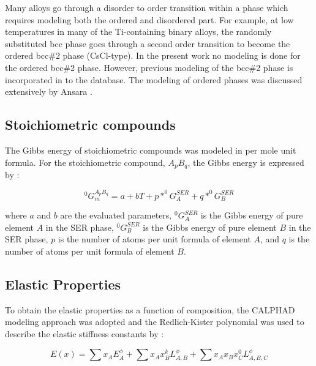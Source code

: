 Many alloys go through a disorder to order transition within a phase which requires modeling both the ordered and disordered part. For example, at low temperatures in many of the Ti-containing binary alloys, the randomly substituted bcc phase goes through a second order transition to become the ordered bcc\#2 phase (CsCl-type). In the present work no modeling is done for the ordered bcc\#2 phase. However, previous modeling of the bcc\#2 phase is incorporated in to the database. The modeling of ordered phases was discussed extensively by Ansara \cite{Ansara1998}. 

\subsection{Stoichiometric compounds}

The Gibbs energy of stoichiometric compounds was modeled in per mole unit formula. For the stoichiometric compound, $A_{p}B_{q}$, the Gibbs energy is expressed by \cite{Zacherl2012}: 

\begin{equation}
\label{eq: stoichiometric}
^{0}G_{m}^{A_{p}B_{q}} = a + bT + p * ^{0}G_{A}^{SER} + q * ^{0}G_{B}^{SER}
\end{equation}

\noindent where $a$ and $b$ are the evaluated parameters, $^{0}G_{A}^{SER}$ is the Gibbs energy of pure element $A$ in the SER phase, $^{0}G_{B}^{SER}$ is the Gibbs energy of pure element $B$ in the SER phase, $p$ is the number of atoms per unit formula of element $A$, and $q$ is the number of atoms per unit formula of element $B$.

\subsection{Elastic Properties}

To obtain the elastic properties as a function of composition, the CALPHAD modeling approach was adopted and the Redlich-Kister polynomial was used to describe the elastic stiffness constants by \cite{Redlich1948b,Shang2010c}: 

\begin{equation}
\label{eq: elastic}
E(x) = \sum x_{A} E_{A}^{\phi} + \sum x_{A} x_{B} ^{k}L_{A,B}^{\phi} + \sum x_{A} x_{B} x_{C} ^{0}L_{A, B, C}^{\phi}
\end{equation}

